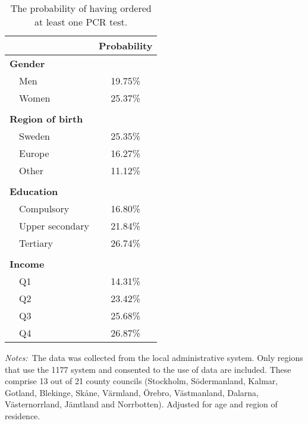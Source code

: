 \begin{table}[htbp]\centering
    \caption{The probability of having ordered at least one PCR test.}\label{tab:ordered}
    \begin{threeparttable}
        \begin{tabular}{@{}lS[table-format={}2.2{\%}]@{}}
            \toprule%
                                & {Probability} \tabularnewline%
            \midrule%
            \textbf{Gender}              &               \tabularnewline%
            ~~Men               & 19.75\%       \tabularnewline%
            ~~Women             & 25.37\%       \tabularnewline\tabularnewline%
            \textbf{Region of birth}     &               \tabularnewline%
            ~~Sweden            & 25.35\%       \tabularnewline%
            ~~Europe            & 16.27\%       \tabularnewline%
            ~~Other             & 11.12\%       \tabularnewline\tabularnewline%
            \textbf{Education}           &               \tabularnewline%
            ~~Compulsory        & 16.80\%       \tabularnewline%
            ~~Upper secondary   & 21.84\%       \tabularnewline%
            ~~Tertiary          & 26.74\%       \tabularnewline\tabularnewline%
            \textbf{Income}              &               \tabularnewline%
            ~~Q1                & 14.31\%       \tabularnewline%
            ~~Q2                & 23.42\%       \tabularnewline%
            ~~Q3                & 25.68\%       \tabularnewline%
            ~~Q4                & 26.87\%       \tabularnewline%
            \bottomrule%
        \end{tabular}
        \begin{tablenotes}\footnotesize\emph{Notes:~}The data was collected from the local administrative system. Only regions that use the 1177 system and consented to the use of data are included. These comprise 13 out of 21 county councils (Stockholm, Södermanland, Kalmar, Gotland, Blekinge, Skåne, Värmland, Örebro, Västmanland, Dalarna, Västernorrland, Jämtland and Norrbotten). Adjusted for age and region of residence.\end{tablenotes}
    \end{threeparttable}
\end{table}
